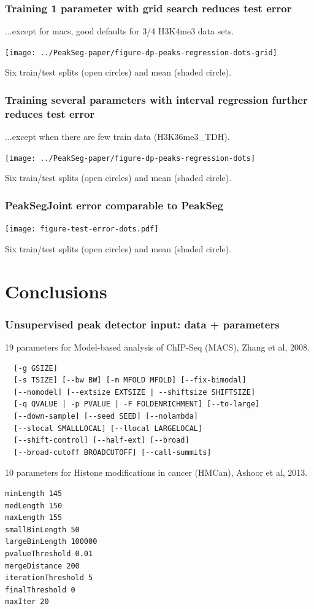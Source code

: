 \documentclass{beamer}
\begin{document}
\begin{frame}
  \frametitle{Training 1 parameter with grid search reduces test error}

  ...except for macs, good defaults for 3/4 H3K4me3 data sets.

  \texttt{[image: ../PeakSeg-paper/figure-dp-peaks-regression-dots-grid]}

  Six train/test splits (open circles) and mean (shaded circle).
\end{frame}

\begin{frame}
  \frametitle{Training several parameters with interval regression 
    further reduces test error}

  ...except when there are few train data (H3K36me3\_TDH).

  \texttt{[image: ../PeakSeg-paper/figure-dp-peaks-regression-dots]}

  Six train/test splits (open circles) and mean (shaded circle).
\end{frame}


\begin{frame}
  \frametitle{PeakSegJoint error comparable to PeakSeg}

  \texttt{[image: figure-test-error-dots.pdf]}

  Six train/test splits (open circles) and mean (shaded circle).
\end{frame}

\section{Conclusions}

\begin{frame}[fragile]
  \frametitle{Unsupervised peak detector input: data + parameters}
\scriptsize
19 parameters for Model-based analysis of ChIP-Seq (MACS), Zhang et al, 2008.
\begin{verbatim}
  [-g GSIZE]
  [-s TSIZE] [--bw BW] [-m MFOLD MFOLD] [--fix-bimodal]
  [--nomodel] [--extsize EXTSIZE | --shiftsize SHIFTSIZE]
  [-q QVALUE | -p PVALUE | -F FOLDENRICHMENT] [--to-large]
  [--down-sample] [--seed SEED] [--nolambda]
  [--slocal SMALLLOCAL] [--llocal LARGELOCAL]
  [--shift-control] [--half-ext] [--broad]
  [--broad-cutoff BROADCUTOFF] [--call-summits]
\end{verbatim}
10 parameters for Histone modifications in cancer (HMCan),
Ashoor et al, 2013.
\begin{verbatim}
minLength 145
medLength 150
maxLength 155
smallBinLength 50
largeBinLength 100000
pvalueThreshold 0.01
mergeDistance 200
iterationThreshold 5
finalThreshold 0
maxIter 20
\end{verbatim}
\end{frame}
\end{document}
